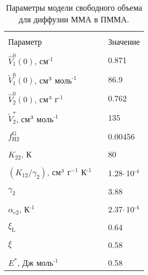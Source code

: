 \begin{table}[h]
	\centering
	\caption{Параметры модели свободного объема для диффузии ММА в ПММА.}
	\begin{tabular}{l c l}
		\hline \hline \\ [-1em]
		Параметр & \hspace{4em} & Значение
		\\ \hline \\ [-1em]
		$\hat{V}_1^0(0)$, см$^\text{-1}$ & \hspace{1em} & 0.871
		\\ \\ [-1em]
		$\tilde{V}_1^0(0)$, см$^\text{3}$ моль$^\text{-1}$ & \hspace{1em} & 86.9
		\\ \\ [-1em]
		$\hat{V}_2^0(0)$, см$^\text{3}$ г$^\text{-1}$ & \hspace{1em} & 0.762
		\\ \\ [-1em]
		$\tilde{V}_2^*$, см$^\text{3}$ моль$^\text{-1}$ & \hspace{1em} & 135
		\\ \\ [-1em]
		$f_\mathrm{H2}^\mathrm{G}$ & \hspace{1em} & 0.00456
		\\ \\ [-1em]
		$K_{22}$, К & \hspace{1em} & 80
		\\ \\ [-1em]
		$(K_{12} / \gamma_2)$, см$^\text{3}$ г$^{-1}$ К$^\text{-1}$ & \hspace{1em} & 1.28\:$\cdot$\,10$^\text{-4}$
		\\ \\ [-1em]
		$\gamma_2$ & \hspace{1em} & 3.88
		\\ \\ [-1em]
		$\alpha_\mathrm{c2}$, К$^\text{-1}$ & \hspace{1em} & 2.37\:$\cdot$\,10$^\text{-4}$
		\\ \\ [-1em]
		$\xi_\mathrm{L}$ & \hspace{1em} & 0.64
		\\ \\ [-1em]
		$\xi$ & \hspace{1em} & 0.58
		\\ \\ [-1em]
		$E^*$, Дж моль$^\text{-1}$ & \hspace{1em} & 0.58

\end{tabular}
\end{table}
